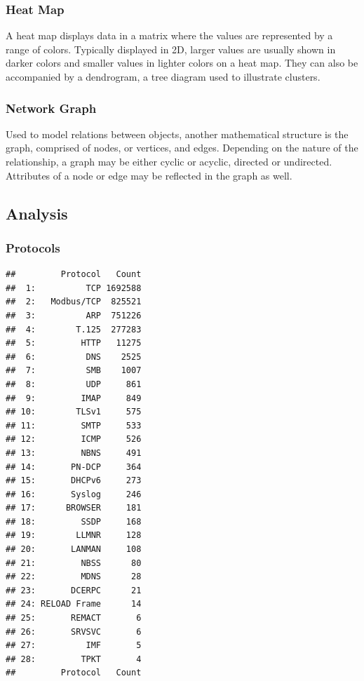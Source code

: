 \documentclass[]{article}
\begin{document}
\subsubsection{Heat Map}\label{heat-map}

A heat map displays data in a matrix where the values are represented by
a range of colors. Typically displayed in 2D, larger values are usually
shown in darker colors and smaller values in lighter colors on a heat
map. They can also be accompanied by a dendrogram, a tree diagram used
to illustrate clusters.

\subsubsection{Network Graph}\label{network-graph}

Used to model relations between objects, another mathematical structure
is the graph, comprised of nodes, or vertices, and edges. Depending on
the nature of the relationship, a graph may be either cyclic or acyclic,
directed or undirected. Attributes of a node or edge may be reflected in
the graph as well.

\subsection{Analysis}\label{analysis}

\subsubsection{Protocols}\label{protocols}

\begin{verbatim}
##         Protocol   Count
##  1:          TCP 1692588
##  2:   Modbus/TCP  825521
##  3:          ARP  751226
##  4:        T.125  277283
##  5:         HTTP   11275
##  6:          DNS    2525
##  7:          SMB    1007
##  8:          UDP     861
##  9:         IMAP     849
## 10:        TLSv1     575
## 11:         SMTP     533
## 12:         ICMP     526
## 13:         NBNS     491
## 14:       PN-DCP     364
## 15:       DHCPv6     273
## 16:       Syslog     246
## 17:      BROWSER     181
## 18:         SSDP     168
## 19:        LLMNR     128
## 20:       LANMAN     108
## 21:         NBSS      80
## 22:         MDNS      28
## 23:       DCERPC      21
## 24: RELOAD Frame      14
## 25:       REMACT       6
## 26:       SRVSVC       6
## 27:          IMF       5
## 28:         TPKT       4
##         Protocol   Count
\end{verbatim}
\end{document}
